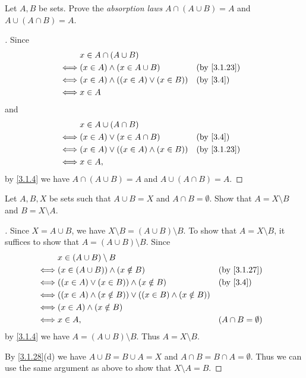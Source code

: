 \begin{ex}\label{ex:3.1.8}
  Let \(A, B\) be sets.
  Prove the \emph{absorption laws} \(A \cap (A \cup B) = A\) and \(A \cup (A \cap B) = A\).
\end{ex}

\begin{proof}[]
  Since
  \begin{align*}
         & x \in A \cap (A \cup B)                                     \\
    \iff & (x \in A) \land (x \in A \cup B)           &  & \by{3.1.23} \\
    \iff & (x \in A) \land ((x \in A) \lor (x \in B)) &  & \by{3.4}    \\
    \iff & x \in A
  \end{align*}
  and
  \begin{align*}
         & x \in A \cup (A \cap B)                                     \\
    \iff & (x \in A) \lor (x \in A \cap B)            &  & \by{3.4}    \\
    \iff & (x \in A) \lor ((x \in A) \land (x \in B)) &  & \by{3.1.23} \\
    \iff & x \in A,
  \end{align*}
  by \cref{3.1.4} we have \(A \cap (A \cup B) = A\) and \(A \cup (A \cap B) = A\).
\end{proof}

\begin{ex}\label{ex:3.1.9}
  Let \(A, B, X\) be sets such that \(A \cup B = X\) and \(A \cap B = \emptyset\).
  Show that \(A = X \setminus B\) and \(B = X \setminus A\).
\end{ex}

\begin{proof}[]
  Since \(X = A \cup B\), we have \(X \setminus B = (A \cup B) \setminus B\).
  To show that \(A = X \setminus B\), it suffices to show that \(A = (A \cup B) \setminus B\).
  Since
  \begin{align*}
         & x \in (A \cup B) \setminus B                                                                   \\
    \iff & (x \in (A \cup B)) \land (x \notin B)                              &  & \by{3.1.27}            \\
    \iff & ((x \in A) \lor (x \in B)) \land (x \notin B)                      &  & \by{3.4}               \\
    \iff & ((x \in A) \land (x \notin B)) \lor ((x \in B) \land (x \notin B))                             \\
    \iff & (x \in A) \land (x \notin B)                                                                   \\
    \iff & x \in A,                                                           &  & (A \cap B = \emptyset)
  \end{align*}
  by \cref{3.1.4} we have \(A = (A \cup B) \setminus B\).
  Thus \(A = X \setminus B\).

  By \cref{3.1.28}(d) we have \(A \cup B = B \cup A = X\) and \(A \cap B = B \cap A = \emptyset\).
  Thus we can use the same argument as above to show that \(X \setminus A = B\).
\end{proof}

